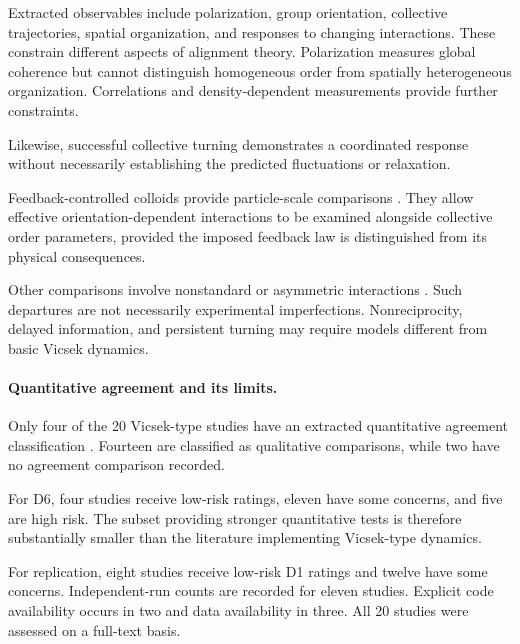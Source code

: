 Extracted observables include polarization,
group orientation, collective trajectories,
spatial organization, and responses to
changing interactions. These constrain
different aspects of alignment theory.
Polarization measures global coherence
but cannot distinguish homogeneous order
from spatially heterogeneous organization.
Correlations and density-dependent
measurements provide further constraints.

Likewise, successful collective turning
demonstrates a coordinated response
without necessarily establishing
the predicted fluctuations or relaxation.

Feedback-controlled colloids provide
particle-scale comparisons
\cite{Chen2024synchronousandfull,Chen2022collectiveresponse,Chen2024persistentandrespo}.
They allow effective orientation-dependent
interactions to be examined alongside
collective order parameters, provided
the imposed feedback law is distinguished
from its physical consequences.

Other comparisons involve nonstandard
or asymmetric interactions
\cite{Fruchart2021nonreciprocalphase,Giomi2013swarmingswirlinga,Liu2025collectivemotionmo}.
Such departures are not necessarily
experimental imperfections. Nonreciprocity,
delayed information, and persistent
turning may require models different
from basic Vicsek dynamics.

\paragraph*{Quantitative agreement and its limits.}

Only four of the 20 Vicsek-type studies
have an extracted quantitative agreement
classification
\cite{Chen2024synchronousandfull,Xiao2023perceptionofmotion,Dizenhaus2026anonymousleadership,Chen2024persistentandrespo}.
Fourteen are classified as qualitative
comparisons, while two have no
agreement comparison recorded.

For D6, four studies receive low-risk
ratings, eleven have some concerns,
and five are high risk. The subset
providing stronger quantitative tests
is therefore substantially smaller
than the literature implementing
Vicsek-type dynamics.

For replication, eight studies receive
low-risk D1 ratings and twelve have
some concerns. Independent-run counts
are recorded for eleven studies.
Explicit code availability occurs
in two and data availability in three.
All 20 studies were assessed
on a full-text basis.

